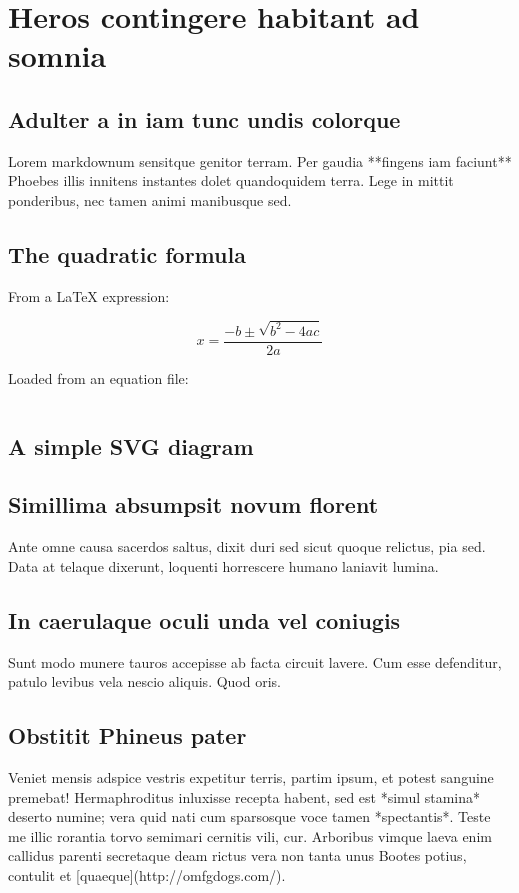 \documentclass{article}
\begin{document}
\section{Heros contingere habitant ad somnia}

\subsection{Adulter a in iam tunc undis colorque}

Lorem markdownum sensitque genitor terram. Per gaudia **fingens iam faciunt**
Phoebes illis innitens instantes dolet quandoquidem terra. Lege in mittit
ponderibus, nec tamen animi manibusque sed.

\subsection{The quadratic formula}

From a LaTeX expression:

$$x=\frac{-b \pm \sqrt{b^2 - 4ac}}{2a}$$

Loaded from an equation file:

$$$$

\subsection{A simple SVG diagram}

\subsection{Simillima absumpsit novum florent}

Ante omne causa sacerdos saltus, dixit duri sed sicut quoque relictus, pia sed.
Data at telaque dixerunt, loquenti horrescere humano laniavit lumina.

\subsection{In caerulaque oculi unda vel coniugis}

Sunt modo munere tauros accepisse ab facta circuit lavere. Cum esse defenditur,
patulo levibus vela nescio aliquis. Quod oris.

\subsection{Obstitit Phineus pater}

Veniet mensis adspice vestris expetitur terris, partim ipsum, et potest sanguine
premebat! Hermaphroditus inluxisse recepta habent, sed est *simul stamina*
deserto numine; vera quid nati cum sparsosque voce tamen *spectantis*. Teste me
illic rorantia torvo semimari cernitis vili, cur. Arboribus vimque laeva enim
callidus parenti secretaque deam rictus vera non tanta unus Bootes potius,
contulit et [quaeque](http://omfgdogs.com/).
\end{document}
